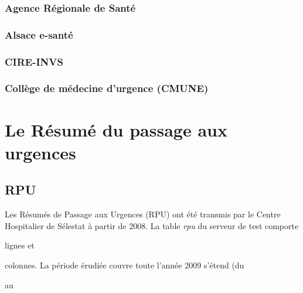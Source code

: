 \documentclass[12pt,english,french,twoside]{report}\usepackage[]{graphicx}\usepackage[]{color}
\begin{document}
  \subsection*{Agence Régionale de Santé}
  \subsection*{Alsace e-santé}
  \subsection*{CIRE-INVS}
  \subsection*{Collège de médecine d'urgence (CMUNE)}
\chapter{Le Résumé du passage aux urgences}


\section*{RPU}

Les Résumés de Passage aux Urgences (RPU) ont été transmis par le Centre Hospitalier de Sélestat à partir de 2008. 
La table \emph{rpu} du serveur de test comporte 

{\ttfamily\noindent\bfseries\color{errorcolor}{\\Error in nrow(d2) : objet 'd2' introuvable}} lignes et 

{\ttfamily\noindent\bfseries\color{errorcolor}{\\Error in ncol(d2) : objet 'd2' introuvable}} colonnes. La période érudiée couvre toute l'année 2009 s'étend (du 

{\ttfamily\noindent\bfseries\color{errorcolor}{\\Error in eval(expr, envir, enclos) : objet 'd2' introuvable}} au 
\end{document}
